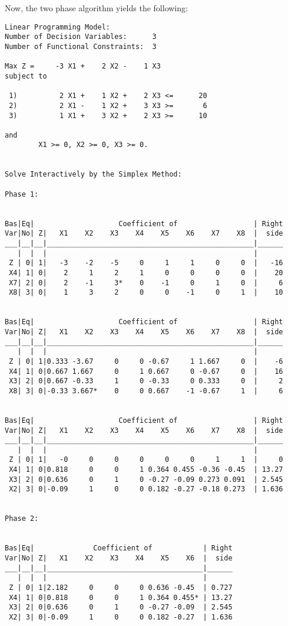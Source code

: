 \documentclass[titlepage, letterpaper]{article}
\begin{document}
Now, the two phase algorithm yields the following:

\begin{lstlisting}[basicstyle=\tiny]
Linear Programming Model:
Number of Decision Variables:      3
Number of Functional Constraints:  3

Max Z =     -3 X1 +    2 X2 -    1 X3 
subject to

 1)          2 X1 +    1 X2 +    2 X3 <=      20
 2)          2 X1 -    1 X2 +    3 X3 >=       6
 3)          1 X1 +    3 X2 +    2 X3 >=      10

and
        X1 >= 0, X2 >= 0, X3 >= 0.


Solve Interactively by the Simplex Method:

Phase 1:


Bas|Eq|                    Coefficient of                  | Right
Var|No| Z|   X1    X2    X3    X4    X5    X6    X7    X8  |  side
___|__|__|_________________________________________________|______
   |  |  |                                                 | 
 Z | 0| 1|   -3    -2    -5     0     1     1     0     0  |   -16
 X4| 1| 0|    2     1     2     1     0     0     0     0  |    20
 X7| 2| 0|    2    -1     3*    0    -1     0     1     0  |     6
 X8| 3| 0|    1     3     2     0     0    -1     0     1  |    10


Bas|Eq|                    Coefficient of                  | Right
Var|No| Z|   X1    X2    X3    X4    X5    X6    X7    X8  |  side
___|__|__|_________________________________________________|______
   |  |  |                                                 | 
 Z | 0| 1|0.333 -3.67     0     0 -0.67     1 1.667     0  |    -6
 X4| 1| 0|0.667 1.667     0     1 0.667     0 -0.67     0  |    16
 X3| 2| 0|0.667 -0.33     1     0 -0.33     0 0.333     0  |     2
 X8| 3| 0|-0.33 3.667*    0     0 0.667    -1 -0.67     1  |     6


Bas|Eq|                    Coefficient of                  | Right
Var|No| Z|   X1    X2    X3    X4    X5    X6    X7    X8  |  side
___|__|__|_________________________________________________|______
   |  |  |                                                 | 
 Z | 0| 1|   -0     0     0     0     0     0     1     1  |     0
 X4| 1| 0|0.818     0     0     1 0.364 0.455 -0.36 -0.45  | 13.27
 X3| 2| 0|0.636     0     1     0 -0.27 -0.09 0.273 0.091  | 2.545
 X2| 3| 0|-0.09     1     0     0 0.182 -0.27 -0.18 0.273  | 1.636


Phase 2:


Bas|Eq|              Coefficient of            | Right
Var|No| Z|   X1    X2    X3    X4    X5    X6  |  side
___|__|__|_____________________________________|______
   |  |  |                                     | 
 Z | 0| 1|2.182     0     0     0 0.636 -0.45  | 0.727
 X4| 1| 0|0.818     0     0     1 0.364 0.455* | 13.27
 X3| 2| 0|0.636     0     1     0 -0.27 -0.09  | 2.545
 X2| 3| 0|-0.09     1     0     0 0.182 -0.27  | 1.636



\end{lstlisting}
\end{document}
